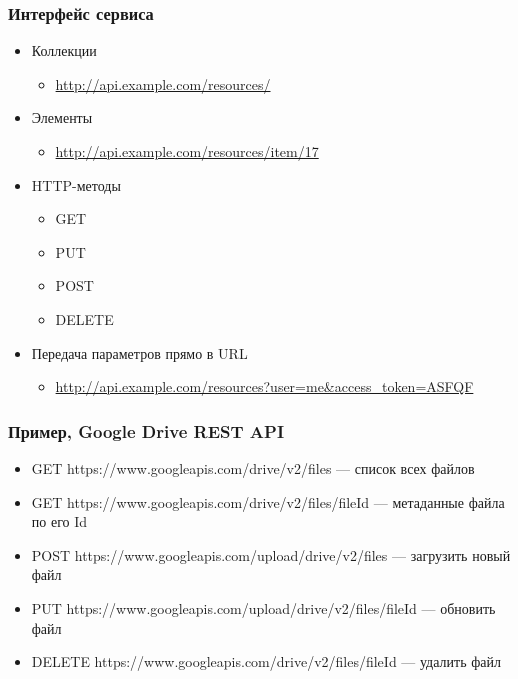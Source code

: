 \documentclass[xetex,mathserif,serif]{beamer}
\begin{document}
	\begin{frame}
		\frametitle{Интерфейс сервиса}
		\begin{itemize}
			\item Коллекции
			\begin{itemize}
				\item \url{http://api.example.com/resources/}
			\end{itemize}
			\item Элементы
			\begin{itemize}
				\item \url{http://api.example.com/resources/item/17}
			\end{itemize}
			\item HTTP-методы
			\begin{itemize}
				\item GET
				\item PUT
				\item POST
				\item DELETE
			\end{itemize}
			\item Передача параметров прямо в URL
			\begin{itemize}
				\item \url{http://api.example.com/resources?user=me&access_token=ASFQF}
			\end{itemize}
		\end{itemize}
	\end{frame}

	\begin{frame}
		\frametitle{Пример, Google Drive REST API}
		\begin{itemize}
			\item GET https://www.googleapis.com/drive/v2/files --- список всех файлов
			\item GET https://www.googleapis.com/drive/v2/files/fileId --- метаданные файла по его Id
			\item POST https://www.googleapis.com/upload/drive/v2/files — загрузить новый файл
			\item PUT https://www.googleapis.com/upload/drive/v2/files/fileId --- обновить файл
			\item DELETE https://www.googleapis.com/drive/v2/files/fileId --- удалить файл
		\end{itemize}
	\end{frame}
\end{document}
